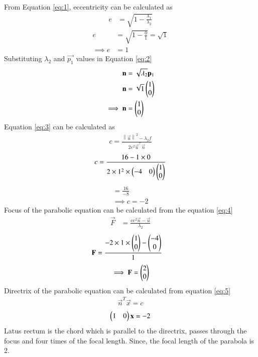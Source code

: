 \documentclass[journal,12pt,twocolumn]{IEEEtran}
\newcommand{\norm}[1]{\left\lVert#1\right\rVert}
\begin{document}
From Equation \ref{eq:1}, eccentricity can be calculated as
\begin{align}
    e&= \sqrt{1-\frac{\lambda_1}{\lambda_2}}
\end{align}
\begin{align}
    e&= \sqrt{1-\frac{0}{1}} =\sqrt{1}\\
     \implies e&= 1
\end{align}
Substituting $\lambda_2$ and $\vec{p_1}$ values in Equation {\ref{eq:2}}
\begin{align}
   \mathbf{n}&= \sqrt{\lambda_2}\mathbf{p}_1\\
   \mathbf{n}&= \sqrt{1}\begin{pmatrix}1\\0\end{pmatrix}\\
   \implies \mathbf{n}&=\begin{pmatrix}1\\0\end{pmatrix}
\end{align}
Equation \ref{eq:3} can be calculated as
\begin{align}
    c = \frac{\norm{\vec{u}}^2 - \lambda_2 f   }{2e^2\vec{u}^{\top}\vec{n}}
\end{align}
\begin{align}
    c = \frac{16-1\times0}{2 \times 1^2 \times \begin{pmatrix}-4&0\end{pmatrix}\begin{pmatrix}1\\0\end{pmatrix}}
\end{align}
\begin{align}
    =\frac{16}{-8}\\
    \implies c = -2
\end{align}
Focus of the parabolic equation can be calculated from the equation \ref{eq:4} 
 \begin{align}
  \vec{F}  &= \frac{ce^2\vec{n}-\vec{u}}{\lambda_2}
\end{align}
 \begin{align}
  \mathbf{F}  &= \frac{-2 \times 1 \times \begin{pmatrix}1\\0\end{pmatrix}-\begin{pmatrix}-4\\0\end{pmatrix}}{1}
\end{align}
\begin{align}
   \implies \mathbf{F}=\begin{pmatrix}2\\0\end{pmatrix} 
\end{align}
Directrix of the parabolic equation can be calculated from equation \ref{eq:5}
\begin{align}
   \vec{n}^T \vec{x}=c 
\end{align}
\begin{align}
    \begin{pmatrix}1&0\end{pmatrix}\mathbf{x}=-2
\end{align}
Latus rectum is the chord which is parallel to the directrix, passes through the focus and four times of the focal length. Since, the focal length of the parabola is 2.\\
\end{document}
